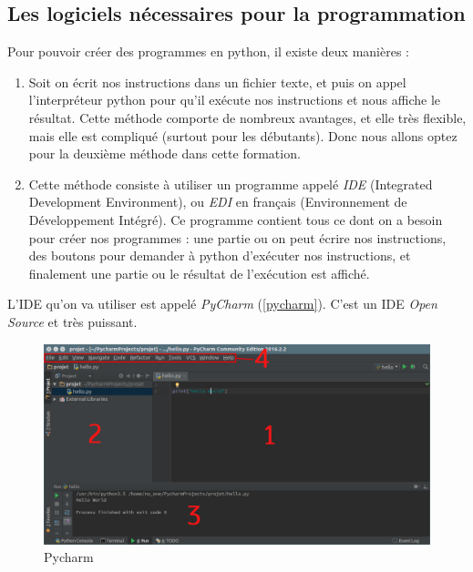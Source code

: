\documentclass[12pt]{article}
\begin{document}
    \subsection{Les logiciels nécessaires pour la programmation}
        Pour pouvoir créer des programmes en python, il existe deux manières :
        \begin{enumerate}
            \item Soit on écrit nos instructions dans un fichier texte, et puis on appel l'interpréteur python pour
                qu'il exécute nos instructions et nous affiche le résultat. Cette méthode comporte de nombreux
                avantages, et elle très flexible, mais elle est compliqué (surtout pour les débutants). Donc nous 
                allons optez pour la deuxième méthode dans cette formation.
            \item Cette méthode consiste à utiliser un programme appelé \emph{IDE} (Integrated Development Environment),
                ou \emph{EDI} en français (Environnement de Développement Intégré). Ce programme contient tous ce dont 
                on a besoin pour créer nos programmes : une partie ou on peut écrire nos instructions, des boutons
                pour demander à python d'exécuter nos instructions, et finalement une partie ou le résultat de 
                l'exécution est affiché.
        \end{enumerate}

        L'IDE qu'on va utiliser est appelé \emph{PyCharm} (\autoref{pycharm}). C'est un IDE \emph{Open Source} et très 
        puissant.
        
        \begin{figure}[H]
            \centering
            \includegraphics[width=\linewidth]{img/8_pycharm.png}
            \caption{Pycharm}
            \label{pycharm}
        \end{figure}
\end{document}
